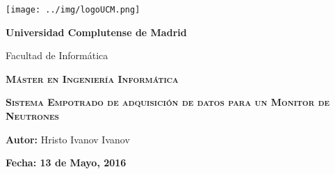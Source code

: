 
\enlargethispage{1cm}
\thispagestyle{empty}

\begin{center}
\texttt{[image: ../img/logoUCM.png]}
\par\end{center}

\begin{center}
\textbf{\huge Universidad Complutense de Madrid}
\par\end{center}{\huge \par}

\begin{center}
{\Large Facultad de Informática}
\par\end{center}{\Large \par}

\medskip{}


\begin{center}
\textbf{\textsc{\huge Máster en Ingeniería Informática}}
\par\end{center}{\huge \par}

\medskip{}

\begin{center}
    \textbf{\textsc{\LARGE 
        Sistema Empotrado de adquisición de datos para un Monitor de Neutrones
    }}
\par\end{center}{\LARGE \par}

\medskip{}


\begin{center}
\textbf{\large Autor:}{\large{} Hristo Ivanov Ivanov}
\par\end{center}{\large \par}

\vspace{0.8cm}

\begin{center}
\textbf{ Fecha: 13 de Mayo, 2016 }{ \par}
\par\end{center}{\large \par}
